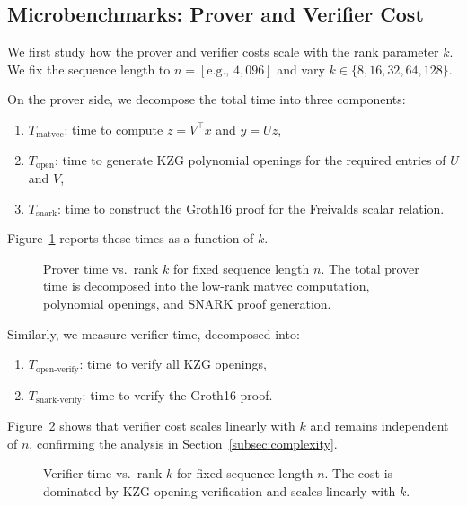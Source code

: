 \documentclass[11pt]{article}
\begin{document}
\subsection{Microbenchmarks: Prover and Verifier Cost}
\label{subsec:microbenchmarks}

We first study how the prover and verifier costs scale with the rank
parameter $k$.
We fix the sequence length to $n = [\text{e.g., }4{,}096]$ and vary
$k \in \{8, 16, 32, 64, 128\}$.

On the prover side, we decompose the total time into three components:
\begin{enumerate}
  \item $T_{\mathrm{matvec}}$: time to compute $z = V^\top x$ and
        $y = U z$,
  \item $T_{\mathrm{open}}$: time to generate KZG polynomial openings
        for the required entries of $U$ and $V$,
  \item $T_{\mathrm{snark}}$: time to construct the Groth16 proof for
        the Freivalds scalar relation.
\end{enumerate}

Figure~\ref{fig:prover-vs-k} reports these times as a function of $k$.

\begin{figure}[t]
  \centering
  \caption{Prover time vs.\ rank $k$ for fixed sequence length $n$.
  The total prover time is decomposed into the low-rank matvec
  computation, polynomial openings, and SNARK proof generation.}
  \label{fig:prover-vs-k}
\end{figure}

Similarly, we measure verifier time, decomposed into:
\begin{enumerate}
  \item $T_{\mathrm{open\text{-}verify}}$:
        time to verify all KZG openings,
  \item $T_{\mathrm{snark\text{-}verify}}$:
        time to verify the Groth16 proof.
\end{enumerate}

Figure~\ref{fig:verifier-vs-k} shows that verifier cost scales linearly
with $k$ and remains independent of $n$, confirming the analysis in
Section~\ref{subsec:complexity}.

\begin{figure}[t]
  \centering
  \caption{Verifier time vs.\ rank $k$ for fixed sequence length $n$.
  The cost is dominated by KZG-opening verification and scales
  linearly with $k$.}
  \label{fig:verifier-vs-k}
\end{figure}
\end{document}
